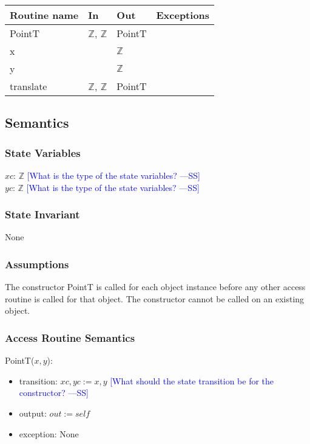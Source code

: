 \documentclass[12pt]{article}
\newcommand{\authornote}[3]{\textcolor{#1}{[#3 ---#2]}}
\newcommand{\authornote}[3]{}
\newcommand{\wss}[1]{\authornote{blue}{SS}{#1}}
\begin{document}
\begin{tabular}{| l | l | l | l |}
\hline
\textbf{Routine name} & \textbf{In} & \textbf{Out} & \textbf{Exceptions}\\
\hline
PointT & $\mathbb{Z}$, $\mathbb{Z}$ & PointT & \\
\hline
x & ~ & $\mathbb{Z}$ & ~\\
\hline
y & ~ & $\mathbb{Z}$ & ~\\
\hline
translate & $\mathbb{Z}$, $\mathbb{Z}$ & PointT & ~\\
\hline
\end{tabular}

\subsection* {Semantics}

\subsubsection* {State Variables}

$xc$: $\mathbb{Z}$ \wss{What is the type of the state variables?}\\
$yc$: $\mathbb{Z}$ \wss{What is the type of the state variables?}

\subsubsection* {State Invariant}

None

\subsubsection* {Assumptions}

The constructor PointT is called for each object instance before any other
access routine is called for that object.  The constructor cannot be called on
an existing object.

\subsubsection* {Access Routine Semantics}

PointT($x, y$):
\begin{itemize}
\item transition: $xc, yc := x, y$
\wss{What should the state transition be for the constructor?}
\item output: $out := \mathit{self}$
\item exception: None
\end{itemize}
\end{document}
